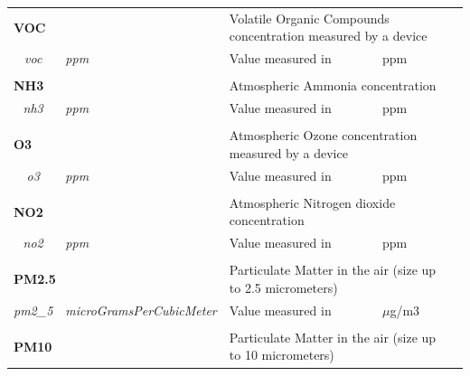 \begin{landscape}
\begin{longtable}{cllll}
   \\[-0.85em]
   \multicolumn{2}{l}{\textbf{VOC}}                                           & \multicolumn{2}{l}{Volatile Organic Compounds concentration measured by a device}       &  \\
   \textit{voc}                          & \textit{ppm}                       & Value measured in                                      & ppm                            &  \\ [0.4em] \cline{1-4}
   \\[-0.85em]
   \multicolumn{2}{l}{\textbf{NH3}}                                           & \multicolumn{2}{l}{Atmospheric Ammonia concentration}                                   &  \\
   \textit{nh3}                          & \textit{ppm}                       & Value measured in                                      & ppm                            &  \\ [0.4em] \cline{1-4}
   \\[-0.85em]
   \multicolumn{2}{l}{\textbf{O3}}                                            & \multicolumn{2}{l}{Atmospheric Ozone concentration measured by a device}                &  \\
   \textit{o3}                           & \textit{ppm}                       & Value measured in                                      & ppm                            &  \\ [0.4em] \cline{1-4}
   \\[-0.85em]
   \multicolumn{2}{l}{\textbf{NO2}}                                           & \multicolumn{2}{l}{Atmospheric Nitrogen dioxide concentration}                          &  \\
   \textit{no2}                          & \textit{ppm}                       & Value measured in                                      & ppm                            &  \\ [0.4em] \cline{1-4}
   \\[-0.85em]
   \multicolumn{2}{l}{\textbf{PM2.5}}                                         & \multicolumn{2}{l}{Particulate Matter in the air (size up to 2.5 micrometers)}          &  \\
   \textit{pm2\_5}                       & \textit{microGramsPerCubicMeter}   & Value measured in                                      & $\mu$g/m3                      &  \\ [0.4em] \cline{1-4}
   \\[-0.85em]
   \multicolumn{2}{l}{\textbf{PM10}}                                          & \multicolumn{2}{l}{Particulate Matter in the air (size up to 10 micrometers)}           &  \\

\end{longtable}
\end{landscape}
